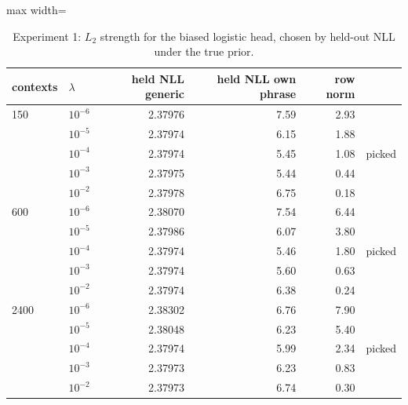 \begin{table}[t]
\centering
\footnotesize
\caption{Experiment 1: $L_2$ strength for the biased logistic head, chosen by held-out NLL under the true prior.}
\label{tab:e1_sweep}
\begin{adjustbox}{max width=\textwidth}
\begin{tabular}{llrrrl}
\toprule
contexts & $\lambda$ & held NLL generic & held NLL own phrase & row norm &  \\
\midrule
150 & $10^{-6}$ & 2.37976 & 7.59 & 2.93 &  \\
 & $10^{-5}$ & 2.37974 & 6.15 & 1.88 &  \\
 & $10^{-4}$ & 2.37974 & 5.45 & 1.08 & picked \\
 & $10^{-3}$ & 2.37975 & 5.44 & 0.44 &  \\
 & $10^{-2}$ & 2.37978 & 6.75 & 0.18 &  \\
\midrule
600 & $10^{-6}$ & 2.38070 & 7.54 & 6.44 &  \\
 & $10^{-5}$ & 2.37986 & 6.07 & 3.80 &  \\
 & $10^{-4}$ & 2.37974 & 5.46 & 1.80 & picked \\
 & $10^{-3}$ & 2.37974 & 5.60 & 0.63 &  \\
 & $10^{-2}$ & 2.37974 & 6.38 & 0.24 &  \\
\midrule
2400 & $10^{-6}$ & 2.38302 & 6.76 & 7.90 &  \\
 & $10^{-5}$ & 2.38048 & 6.23 & 5.40 &  \\
 & $10^{-4}$ & 2.37974 & 5.99 & 2.34 & picked \\
 & $10^{-3}$ & 2.37973 & 6.23 & 0.83 &  \\
 & $10^{-2}$ & 2.37973 & 6.74 & 0.30 &  \\
\bottomrule
\end{tabular}
\end{adjustbox}
\end{table}